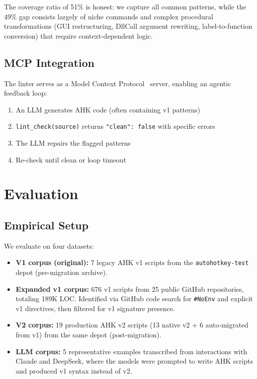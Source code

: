 \documentclass[11pt,a4paper]{article}
\begin{document}
The coverage ratio of 51\% is honest: we capture all common patterns, while the 49\% gap consists largely of niche commands and complex procedural transformations (GUI restructuring, DllCall argument rewriting, label-to-function conversion) that require context-dependent logic.

\subsection{MCP Integration}

The linter serves as a Model Context Protocol~\cite{mcp} server, enabling an agentic feedback loop:

\begin{enumerate}
  \item An LLM generates AHK code (often containing v1 patterns)
  \item \texttt{lint\_check(source)} returns {\tt "clean": false} with specific errors
  \item The LLM repairs the flagged patterns
  \item Re-check until clean or loop timeout
\end{enumerate}

\section{Evaluation}

\subsection{Empirical Setup}

We evaluate on four datasets:

\begin{itemize}
  \item \textbf{V1 corpus (original):} 7 legacy AHK v1 scripts from the \texttt{autohotkey-test} depot (pre-migration archive).
  \item \textbf{Expanded v1 corpus:} 676 v1 scripts from 25 public GitHub repositories, totaling 189K LOC. Identified via GitHub code search for \texttt{\#NoEnv} and explicit v1 directives, then filtered for v1 signature presence.
  \item \textbf{V2 corpus:} 19 production AHK v2 scripts (13 native v2 + 6 auto-migrated from v1) from the same depot (post-migration).
  \item \textbf{LLM corpus:} 5 representative examples transcribed from interactions with Claude and DeepSeek, where the models were prompted to write AHK scripts and produced v1 syntax instead of v2.
\end{itemize}
\end{document}
